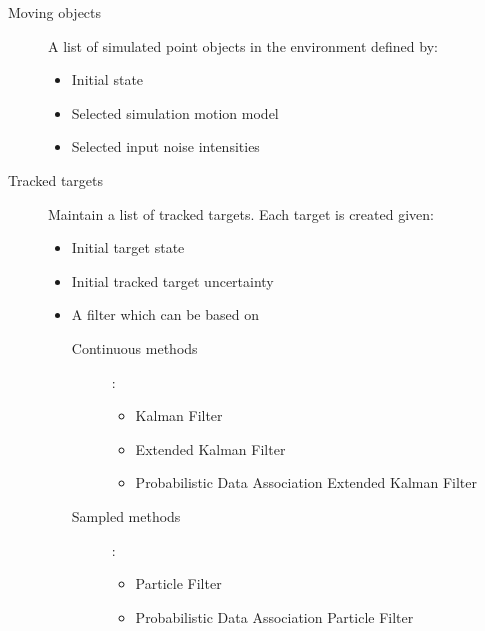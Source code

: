 \begin{description}
	\item[Moving objects] A list of simulated point objects in the environment defined by:
	\begin{itemize}
		\item Initial state
		\item Selected simulation motion model
		\item Selected input noise intensities
	\end{itemize}
\end{description}

\begin{description}
	\item[Tracked targets] Maintain a list of tracked targets. Each target is created given:
	\begin{itemize}
		\item Initial target state
		\item Initial tracked target uncertainty
		\item A filter which can be based on
			\begin{description}
				\item[Continuous methods]:
					\begin{itemize}
						\item Kalman Filter
						\item Extended Kalman Filter
						\item Probabilistic Data Association Extended Kalman Filter
					\end{itemize}		
			\end{description}
			\begin{description}
				\item[Sampled methods]:
					\begin{itemize}
						\item Particle Filter
						\item Probabilistic Data Association Particle Filter
					\end{itemize}
			\end{description}			
	\end{itemize}
\end{description}


